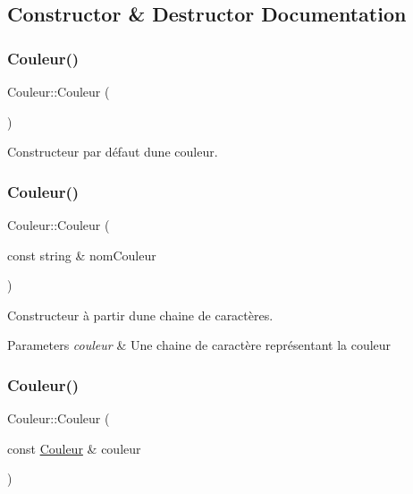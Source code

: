 \subsection{Constructor \& Destructor Documentation}
\mbox{\label{class_couleur_a687a457edb08b51dbcd0299bb0b6a882}} 
\subsubsection{\texorpdfstring{Couleur()}{Couleur()}\hspace{0.1cm}{\footnotesize\ttfamily [1/3]}}
{\footnotesize\ttfamily Couleur\+::\+Couleur (\begin{DoxyParamCaption}{ }\end{DoxyParamCaption})}



Constructeur par défaut d\textquotesingle{}une couleur. 

\mbox{\label{class_couleur_a3875e178605e5a425a473b9034f796b3}} 
\subsubsection{\texorpdfstring{Couleur()}{Couleur()}\hspace{0.1cm}{\footnotesize\ttfamily [2/3]}}
{\footnotesize\ttfamily Couleur\+::\+Couleur (\begin{DoxyParamCaption}\item[{const string \&}]{nom\+Couleur }\end{DoxyParamCaption})}



Constructeur à partir d\textquotesingle{}une chaine de caractères. 


\begin{DoxyParams}{Parameters}
{\em couleur} & Une chaine de caractère représentant la couleur \\
\hline
\end{DoxyParams}
\mbox{\label{class_couleur_ae5694f3994756524981394433bbdc85f}} 
\subsubsection{\texorpdfstring{Couleur()}{Couleur()}\hspace{0.1cm}{\footnotesize\ttfamily [3/3]}}
{\footnotesize\ttfamily Couleur\+::\+Couleur (\begin{DoxyParamCaption}\item[{const \hyperlink{class_couleur}{Couleur} \&}]{couleur }\end{DoxyParamCaption})}



